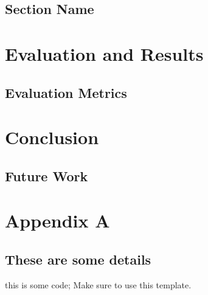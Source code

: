 \documentclass[12pt, a4paper]{report}
\newenvironment{code}
{\footnotesize\verbatim}{\endverbatim\normalfont}
\theoremstyle{definition}
\theoremstyle{definition}%
\theoremstyle{definition}%
\theoremstyle{definition}%
\theoremstyle{definition}%
\theoremstyle{definition}%
\renewcommand{\cite}[1]{[\citealp{#1}]}
\begin{document}
\section{Section Name}


\chapter{Evaluation and Results}

\section{Evaluation Metrics}


\chapter{Conclusion}
\section{Future Work}
\appendix

\chapter{Appendix A}
\section{These are some details}
\begin{code}
this is some code;
Make sure to use this template.
\end{code}


\bibliomatter




 
 
\end{document}
